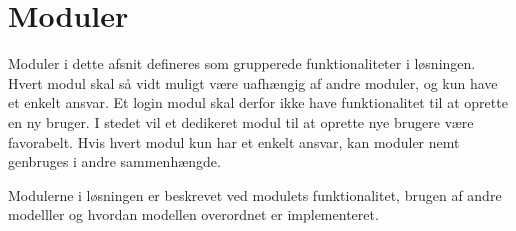 \section{Moduler}
\label{sec:moduler}

Moduler i dette afsnit defineres som grupperede funktionaliteter i løsningen. Hvert modul skal så vidt muligt være uafhængig af andre moduler, og kun have et enkelt ansvar. Et login modul skal derfor ikke have funktionalitet til at oprette en ny bruger. I stedet vil et dedikeret modul til at oprette nye brugere være favorabelt. Hvis hvert modul kun har et enkelt ansvar, kan moduler nemt genbruges i andre sammenhængde.

Modulerne i løsningen er beskrevet ved modulets funktionalitet, brugen af andre modelller og hvordan modellen overordnet er implementeret.







